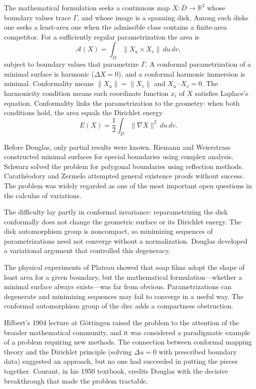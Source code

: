 The mathematical formulation seeks a continuous map $X: \overline D \to
\mathbb{R}^3$ whose boundary values trace $\Gamma$, and whose image is a
spanning disk. Among such disks one seeks a least-area one when the
admissible class contains a finite-area competitor. For a sufficiently
regular parametrization the area is
\[
\mathcal{A}(X) = \int_D \|X_u \times X_v\| \, du\,dv,
\]
subject to boundary values that parametrize $\Gamma$. A conformal
parametrization of a minimal surface is harmonic ($\Delta X=0$), and a
conformal harmonic immersion is minimal. Conformality means $\|X_u\|=
\|X_v\|$ and $X_u\cdot X_v=0$. The harmonicity condition means each coordinate function
$x_i$ of $X$ satisfies Laplace's equation. Conformality links the
parametrization to the geometry: when both conditions hold, the area
equals the Dirichlet energy
\[
E(X) = \frac{1}{2}\int_D \|\nabla X\|^2\,du\,dv.
\]

Before Douglas, only partial results were known. Riemann and Weierstrass
constructed minimal surfaces for special boundaries using complex
analysis. Schwarz solved the problem for polygonal boundaries using
reflection methods. Carath\'eodory and Zermelo attempted general
existence proofs without success. The problem was widely regarded as one
of the most important open questions in the calculus of variations.

The difficulty lay partly in conformal invariance: reparametrizing the
disk conformally does not change the geometric surface or its Dirichlet
energy. The disk automorphism group is noncompact, so minimizing
sequences of parametrizations need not converge without a normalization.
Douglas developed a variational argument that controlled this
degeneracy.

The physical experiments of Plateau showed that soap films adopt the
shape of least area for a given boundary, but the mathematical
formulation---whether a minimal surface always exists---was far from
obvious. Parametrizations can degenerate and minimizing sequences may
fail to converge in a useful way. The conformal automorphism group of
the disc adds a compactness obstruction.

Hilbert's 1904 lecture at G\"{o}ttingen raised the problem to the
attention of the broader mathematical community, and it was considered a
paradigmatic example of a problem requiring new methods. The connection
between conformal mapping theory and the Dirichlet principle (solving
$\Delta u = 0$ with prescribed boundary data) suggested an approach, but
no one had succeeded in putting the pieces together. Courant, in his
1950 textbook, credits Douglas with the decisive breakthrough that made
the problem tractable.


